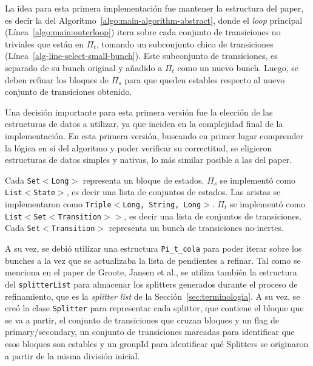 La idea para esta primera implementación fue mantener la estructura del paper, es decir la del Algoritmo~\ref{algo:main-algorithm-abstract}, donde el \textit{loop} principal (Línea~\ref{algo:main:outerloop}) itera sobre cada conjunto de transiciones no triviales que están en $\Pi_t$, tomando un subconjunto chico de transiciones (Línea~\ref{alg-line-select-small-bunch}). Este subconjunto de transiciones, es separado de su bunch original y añadido a $\Pi_t$ como un nuevo bunch. Luego, se deben refinar los bloques de $\Pi_s$ para que queden estables respecto al nuevo conjunto de transiciones obtenido.

Una decisión importante para esta primera versión fue la elección de las estructuras de datos a utilizar, ya que inciden en la complejidad final de la implementación. En esta primera versión, buscando en primer lugar comprender la lógica en sí del algoritmo y poder verificar su correctitud, se eligieron estructuras de datos simples y nativas, lo más similar posible a las del paper. 

Cada \texttt{Set$<$Long$>$} representa un bloque de estados. $\Pi_s$ se implementó como \texttt{List$<$State$>$}, es decir una lista de conjuntos de estados. 
Las aristas se implementaron como \texttt{Triple$<$Long, String, Long$>$}. $\Pi_t$ se implementó como \texttt{List$<$Set$<$Transition$>$$>$}, es decir una lista de conjuntos de transiciones. Cada \texttt{Set$<$Transition$>$} representa un bunch de transiciones no-inertes. 

A su vez, se debió utilizar una estructura \texttt{Pi\_t\_cola} para poder iterar sobre los bunches a la vez que se actualizaba la lista de pendientes a refinar.
Tal como se menciona en el paper de Groote, Jansen et al., se utiliza también la estructura del \texttt{splitterList} para almacenar los splitters generados durante el proceso de refinamiento, que es la \textit{splitter list} de la Sección~\ref{sec:terminologia}. A su vez, se creó la clase \texttt{Splitter} para representar cada splitter, que contiene el bloque que se va a partir, el conjunto de transiciones que cruzan bloques y un flag de primary/secondary, un conjunto de transiciones marcadas para identificar que esos bloques son estables y un groupId para identificar qué Splitters se originaron a partir de la misma división inicial.

